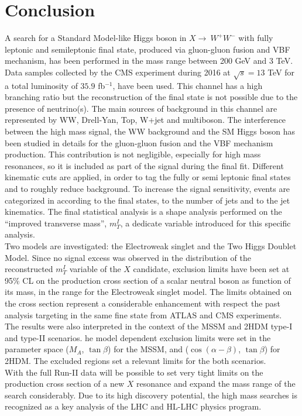 \chapter*{Conclusion}
A search for a Standard Model-like Higgs boson in $X \to \ W^+W^-$ with fully leptonic and semileptonic final state, produced via gluon-gluon fusion and VBF 
mechanism, has been performed in the mass range between 200 GeV and 3 TeV.
Data samples collected by the CMS experiment during 2016 at $\sqrt{s}=13$ TeV for a total luminosity of $35.9$ fb$^{-1}$, have been used.
This channel has a high branching ratio but the reconstruction of the final state is not possible due to the presence of neutrino(s). 
The main sources of background in this channel are represented by WW, Drell-Yan, Top, W+jet and multiboson.
The interference between the high mass signal, the WW background and the SM Higgs boson has been studied in details for the gluon-gluon fusion and the VBF mechanism production.
This contribution is not negligible, especially for high mass resonances, so   it is included as part of the signal during the final fit.
Different kinematic cuts are applied, in order to tag the fully or semi leptonic final states and to roughly reduce background. 
To increase the signal  sensitivity,  events are categorized in according to the final states, to the number of jets 
and to the jet kinematics. 
The final statistical analysis is a shape analysis performed on the ``improved transverse mass'', $m_T^I$, a dedicate variable
introduced for this specific analysis.\\
Two models are investigated: the Electroweak singlet and the Two Higgs Doublet Model.
Since no signal excess was observed in the distribution of the reconstructed $m_T^I$ variable of the $X$ candidate,  
exclusion limits have been set at 95\% CL on the production cross section of a scalar neutral boson
as function of its mass, in the range  for the Electroweak singlet model.
The limits obtained on the cross section represent a considerable enhancement with respect the past analysis 
targeting in the same fine state from ATLAS and CMS experiments.\\
The results were also interpreted in the context of the MSSM and 2HDM type-I and type-II scenarios.  
he model dependent exclusion limits were set in the parameter space ($M_A$, $\tan \beta$) for the MSSM, and ($\cos(\alpha - \beta)$, $\tan \beta$) for
2HDM. The excluded regions set a relevant limits for the both scenarios.\\
\newline
With the full Run-II data will be possible to set very tight limits on the
production cross section of a new $X$ resonance and expand the mass range
of the search considerably.
Due to its high discovery potential, the high mass searches  is recognized as a key analysis of the LHC and HL-LHC physics
program.












